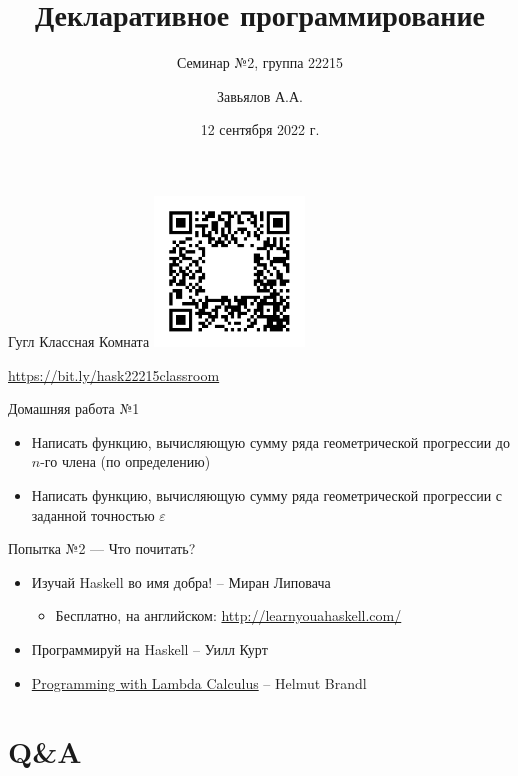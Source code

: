 \documentclass{beamer}
\title{Декларативное программирование}
\subtitle{Семинар №2, группа 22215}
\author{Завьялов А.А.}
\date{12 сентября 2022 г.}
\institute{Кафедра систем информатики ФИТ НГУ}
\begin{document}
  \maketitle
  \addtocounter{framenumber}{1}
  \begin{frame}{Гугл Классная Комната}
  \includegraphics[width=4cm]{media/classroom-invite-22215}
  
  \url{https://bit.ly/hask22215classroom}
  \end{frame}
  \begin{frame}{Домашняя работа №1}
      \begin{itemize}
          \item Написать функцию, вычисляющую сумму ряда геометрической прогрессии до $n$-го члена (по определению)
          \item Написать функцию, вычисляющую сумму ряда геометрической прогрессии с заданной точностью $\varepsilon$
      \end{itemize}
  \end{frame}
  \begin{frame}{Попытка №2 --- Что почитать?}
      \begin{itemize}
          \item Изучай Haskell во имя добра! -- Миран Липовача
          \begin{itemize}
              \item Бесплатно, на английском: \url{http://learnyouahaskell.com/}
          \end{itemize}
          \item Программируй на Haskell -- Уилл Курт
      \end{itemize}
      \begin{itemize}
          \item \alert{\href{https://hbr.github.io/Lambda-Calculus/lambda2/lambda.html}{Programming with Lambda Calculus}} -- Helmut Brandl
      \end{itemize}
  \end{frame}
  \section{Q\&A}
\end{document}
